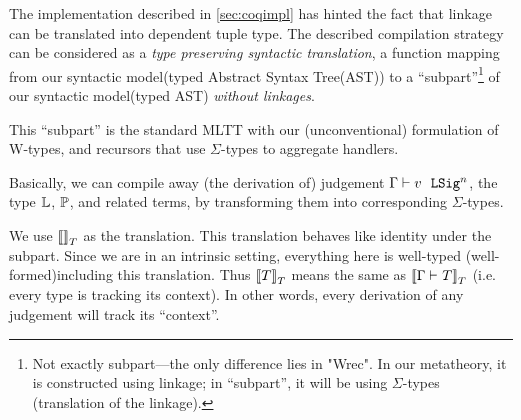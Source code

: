 The implementation described in \cref{sec:coqimpl} has hinted the fact that
linkage can be translated into dependent tuple type.
The described compilation strategy can be considered as
a \textit{type preserving syntactic translation}, a function mapping from our syntactic
model(typed Abstract Syntax Tree(AST)) to a ``subpart''\footnote{Not exactly subpart---the only
difference lies in "Wrec". In our metatheory, it is constructed
using linkage; in ``subpart'', it will be using $\Sigma$-types (translation
of the linkage).} of our syntactic model(typed AST) \textit{without
linkages}.

This ``subpart'' is the standard MLTT with our
(unconventional) formulation of W-types,
and recursors that use $\Sigma$-types to aggregate handlers.

Basically, we can compile away (the derivation of) judgement $ {\Gamma} \vdash {v} \ \ \texttt{LSig}^{n} $,
the type $\mathbb{L}$, $\mathbb{P}$, and related terms, by transforming them into
corresponding $\Sigma$-types.

 


We use ${{\llbracket {} \rrbracket}_T}$ as the translation. This translation behaves like identity
under the subpart. Since we are in an intrinsic setting, everything here
is well-typed (well-formed)including this translation. Thus
${{\llbracket {T} \rrbracket}_T}$ means the same as ${{\llbracket {\ensuremath{ {\Gamma} \vdash_{} {T} }} \rrbracket}_T}$
(i.e. every type is tracking its context). In other words, every
derivation of any judgement will track its ``context''. 


